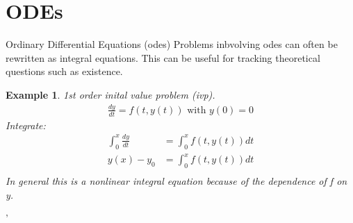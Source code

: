 \documentclass[10pt, oneside]{article}
\newtheorem{example}{Example}
\begin{document}
\section{ODEs}
Ordinary Differential Equations (odes)
Problems inbvolving odes can often be rewritten as integral equations. This can be useful for tracking theoretical questions such as existence.
\begin{example}
    1st order inital value problem (ivp).
    \begin{align*}
        \frac{dy}{dt} = f(t,y(t)) \text{ with } y(0) = 0 
    \end{align*}
    Integrate:
    \begin{align*}
        \int_{0}^{x}\frac{dy}{dt} & = \int_{0}^{x}f(t,y(t))dt\\
        y(x) - y_{0} &= \int_{0}^{x}f(t,y(t))dt \\
    \end{align*}
    In general this is a nonlinear integral equation because of the dependence of f on y. 
\end{example}'
\end{document}
